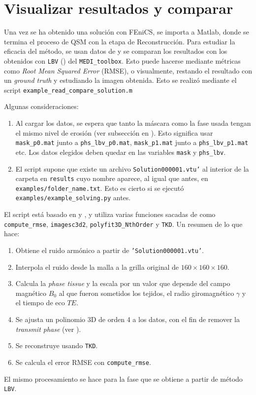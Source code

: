 \newpage

\section{Visualizar resultados y comparar}

Una vez se ha obtenido una solución con FEniCS, se importa a Matlab, donde se termina el proceso de QSM con la etapa de Reconstrucción. Para estudiar la eficacia del método, se usan datos de \cite{challenge} y se comparan los resultados con los obtenidos con \texttt{LBV} (\cite{lbv_fmg}) del \texttt{MEDI\_toolbox}. Esto puede hacerse mediante métricas como \textit{Root Mean Squared Error} (RMSE), o visualmente, restando el resultado con un \textit{ground truth} y estudiando la imagen obtenida. Esto se realizó mediante el script \texttt{example\_read\_compare\_solution.m}

Algunas consideraciones:


\begin{enumerate}
    \item Al cargar los datos, se espera que tanto la máscara como la fase usada tengan el mismo nivel de erosión (ver subsección  en ). Esto significa usar \texttt{mask\_p0.mat} junto a \texttt{phs\_lbv\_p0.mat}, \texttt{mask\_p1.mat} junto a \texttt{phs\_lbv\_p1.mat} etc. Los datos elegidos deben quedar en las variables \texttt{mask} y \texttt{phs\_lbv}.
    \item El script supone que existe un archivo \texttt{Solution000001.vtu'} al interior de la carpeta en \texttt{results} cuyo nombre aparece, al igual que antes, en \texttt{examples/folder\_name.txt}. Esto es cierto si se ejecutó \texttt{examples/example\_solving.py} antes.
\end{enumerate}

El script está basado en \cite{challenge} y \cite{fansi}, y utiliza varias funciones sacadas de \cite{challenge} como \texttt{compute\_rmse}, \texttt{imagesc3d2}, \texttt{polyfit3D\_NthOrder} y \texttt{TKD}. Un resumen de lo que hace:


\begin{enumerate}
    \item Obtiene el ruido armónico a partir de \texttt{'Solution000001.vtu'}.
    \item Interpola el ruido desde la malla a la grilla original de $160 \times 160 \times 160$.
    \item Calcula la \textit{phase tissue} y la escala por un valor que depende del campo magnético $B_0$ al que fueron sometidos los tejidos, el radio giromagnético $\gamma$ y el tiempo de eco $TE$.
    \item Se ajusta un polinomio 3D de orden 4 a los datos, con el fin de remover la \textit{transmit phase} (ver \cite{challenge}).
    \item Se reconstruye usando \texttt{TKD}.
    \item Se calcula el error RMSE con \texttt{compute\_rmse}.
\end{enumerate}

El mismo procesamiento se hace para la fase que se obtiene a partir de método \texttt{LBV}.